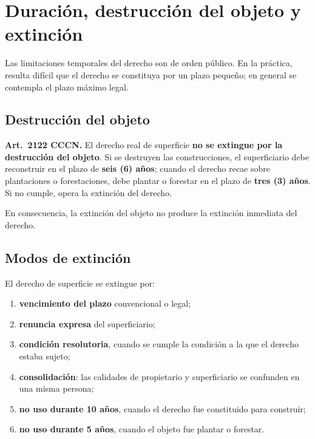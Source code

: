 \documentclass[12pt,oneside]{book}
\begin{document}
\section{Duración, destrucción del objeto y extinción}

Las limitaciones temporales del derecho son de orden público. En la práctica, resulta difícil que el derecho se constituya por un plazo pequeño; en general se contempla el plazo máximo legal.

\subsection{Destrucción del objeto}

\begin{importante}
\textbf{Art.~2122 CCCN.} El derecho real de superficie \textbf{no se extingue por la destrucción del objeto}. Si se destruyen las construcciones, el superficiario debe reconstruir en el plazo de \textbf{seis (6) años}; cuando el derecho recae sobre plantaciones o forestaciones, debe plantar o forestar en el plazo de \textbf{tres (3) años}. Si no cumple, opera la extinción del derecho.
\end{importante}

En consecuencia, la extinción del objeto no produce la extinción inmediata del derecho.

\subsection{Modos de extinción}

El derecho de superficie se extingue por:

\begin{enumerate}
    \item \textbf{vencimiento del plazo} convencional o legal;
    \item \textbf{renuncia expresa} del superficiario;
    \item \textbf{condición resolutoria}, cuando se cumple la condición a la que el derecho estaba sujeto;
    \item \textbf{consolidación}: las calidades de propietario y superficiario se confunden en una misma persona;
    \item \textbf{no uso durante 10 años}, cuando el derecho fue constituido para construir;
    \item \textbf{no uso durante 5 años}, cuando el objeto fue plantar o forestar.
\end{enumerate}
\end{document}
